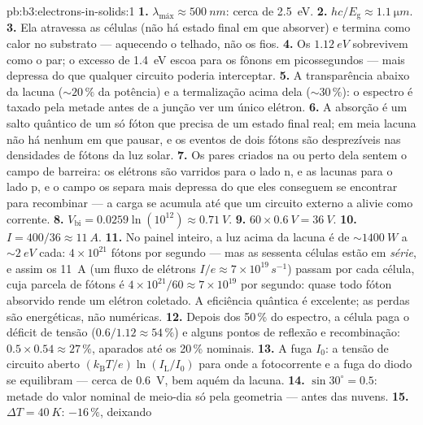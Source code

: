 \begin{solution}{pb:b3:electrons-in-solids:1}
\textbf{1.} $\lambda_{\text{máx}} \approx \qty{500}{nm}$:
cerca de \qty{2.5}{eV}.
\textbf{2.} $hc/E_{\text{g}} \approx \qty{1.1}{\micro m}$.
\textbf{3.} Ela atravessa as células (não há estado final em que
absorver) e termina como calor no substrato --- aquecendo o telhado, não
os fios.
\textbf{4.} Os $\qty{1.12}{eV}$ sobrevivem como o par; o excesso de
\qty{1.4}{eV} escoa para os fônons em picossegundos --- mais depressa
do que qualquer circuito poderia interceptar.
\textbf{5.} A transparência abaixo da lacuna ($\sim20\,\%$ da potência) e
a termalização acima dela ($\sim30\,\%$): o espectro é taxado pela
metade antes de a junção ver um único elétron.
\textbf{6.} A absorção é um salto quântico de um só fóton que precisa
de um estado final real; em meia lacuna não há nenhum em que pausar, e
os eventos de dois fótons são desprezíveis nas densidades de fótons da luz solar.
\textbf{7.} Os pares criados na  ou perto dela sentem o
campo de barreira: os elétrons são varridos para o lado n, e as lacunas
para o lado p, e o campo os separa mais depressa do que eles conseguem
se encontrar para recombinar --- a carga se acumula até que um circuito
externo a alivie como corrente.
\textbf{8.} $V_{\text{bi}} = 0.0259\ln(10^{12}) \approx
\qty{0.71}{V}$.
\textbf{9.} $60\times\qty{0.6}{V} = \qty{36}{V}$.
\textbf{10.} $I = 400/36 \approx \qty{11}{A}$.
\textbf{11.} No painel inteiro, a luz acima da lacuna é de
$\sim\qty{1400}{W}$ a $\sim\qty{2}{eV}$ cada: $4\times10^{21}$
fótons por segundo --- mas as sessenta células estão em \emph{série},
e assim os \qty{11}{A} (um fluxo de elétrons $I/e \approx
7\times10^{19}\,\unit{s^{-1}}$) passam por cada célula, cuja
parcela de fótons é $4\times10^{21}/60 \approx
7\times10^{19}$ por segundo: quase todo fóton absorvido rende
um elétron coletado. A eficiência quântica é excelente; as
perdas são energéticas, não numéricas.
\textbf{12.} Depois dos 50\,\% do espectro, a célula paga o
déficit de tensão ($0.6/1.12 \approx 54\,\%$) e alguns pontos de
reflexão e recombinação: $0.5\times0.54 \approx 27\,\%$,
aparados até os 20\,\% nominais.
\textbf{13.} A fuga $I_0$: a tensão de circuito aberto
$(k_{\text{B}}T/e)\ln(I_{\text{L}}/I_0)$ para onde a
fotocorrente e a fuga do diodo se equilibram --- cerca de \qty{0.6}{V}, bem
aquém da lacuna.
\textbf{14.} $\sin30^\circ = 0.5$: metade do valor nominal de meio-dia só
pela geometria --- antes das nuvens.
\textbf{15.} $\Delta T = \qty{40}{K}$: $-16\,\%$, deixando

\end{solution}
